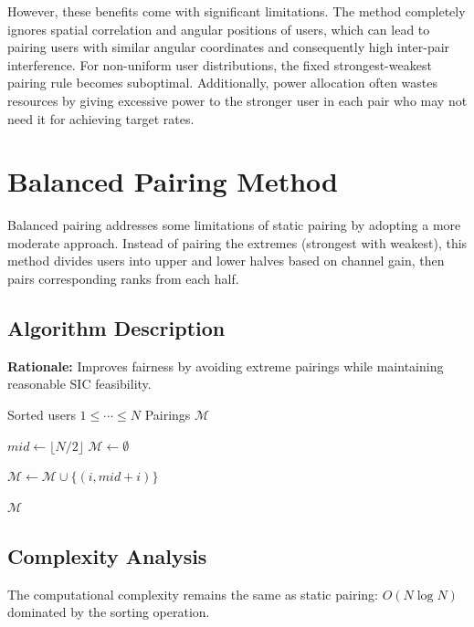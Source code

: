 However, these benefits come with significant limitations. The method completely ignores spatial correlation and angular positions of users, which can lead to pairing users with similar angular coordinates and consequently high inter-pair interference. For non-uniform user distributions, the fixed strongest-weakest pairing rule becomes suboptimal. Additionally, power allocation often wastes resources by giving excessive power to the stronger user in each pair who may not need it for achieving target rates.

\section{Balanced Pairing Method}

Balanced pairing addresses some limitations of static pairing by adopting a more moderate approach. Instead of pairing the extremes (strongest with weakest), this method divides users into upper and lower halves based on channel gain, then pairs corresponding ranks from each half.

\subsection{Algorithm Description}

\textbf{Rationale:} Improves fairness by avoiding extreme pairings while maintaining reasonable SIC feasibility.

\begin{algorithm}[H]
\caption{Balanced Pairing}
\label{alg:balanced}
\begin{algorithmic}[1]
\Require Sorted users $1 \leq \cdots \leq N$
\Ensure Pairings $\mathcal{M}$

\State $mid \gets \lfloor N/2 \rfloor$
\State $\mathcal{M} \gets \emptyset$

    \State $\mathcal{M} \gets \mathcal{M} \cup \{(i, mid + i)\}$
\EndFor

\State \Return $\mathcal{M}$
\end{algorithmic}
\end{algorithm}

\subsection{Complexity Analysis}

The computational complexity remains the same as static pairing: $O(N \log N)$ dominated by the sorting operation.

